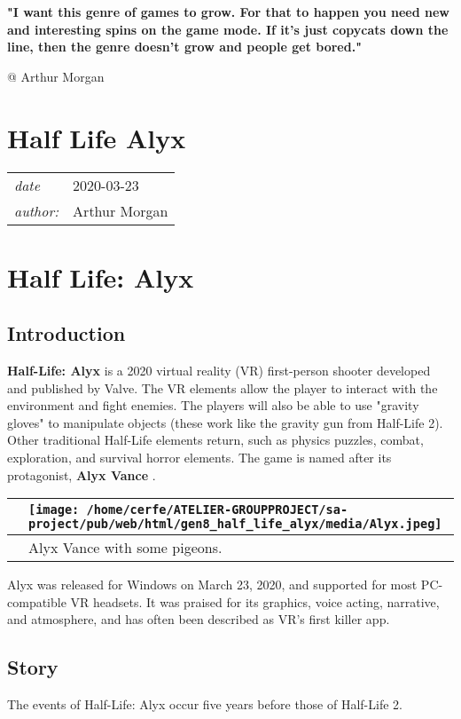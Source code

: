 \documentclass[a4paper,10pt]{book}
\newcommand{\pageHeader}[4]{
    \section{#1}
    \vspace{-0.3cm}
    \begin{table}[h!]
     \begin{tabular}{ll}
        \hline
        \textit{date} & #2 \\
        \textit{author: } & #3\\
        \hline
     \end{tabular}
    \end{table}
    \vspace{-0.3cm}
}
\begin{document}
 
 \textbf{
          "I want this genre of games to grow. For that to happen you need new and interesting spins on the game mode. If it's just copycats down the line, then the genre doesn't grow and people get bored."
         } 
 
 
 
          @ Arthur Morgan
       
 
 
 \newpage\pageHeader{Half Life Alyx}{2020-03-23}{Arthur Morgan}{VR's first killer app, Half Life: Alyx}
 \section{Half Life: Alyx }
 \subsection{Introduction }
 
 \textbf{Half-Life: Alyx }  is a 2020 virtual reality (VR) first-person shooter developed and published by Valve.
         The VR elements allow the player to interact with the environment and fight enemies.
         The players will also be able to use "gravity gloves" to manipulate objects (these work like the gravity gun from Half-Life 2).
         Other traditional Half-Life elements return, such as physics puzzles, combat, exploration, and survival horror elements. 
         The game is named after its protagonist,  \textbf{Alyx Vance } .
        
 \begin{longtable}{p{1mm}|l|}\hline
 
 & \texttt{[image: /home/cerfe/ATELIER-GROUPPROJECT/sa-project/pub/web/html/gen8\_half\_life\_alyx/media/Alyx.jpeg]}
 \\\hline
 
 & Alyx Vance with some pigeons. 
 \\\hline
 \end{longtable}
 
         Alyx was released for Windows on March 23, 2020, and supported for most PC-compatible VR headsets.
         It was praised for its graphics, voice acting, narrative, and atmosphere, and has often been described as VR's first killer app.
        
 
 \subsection{Story }
 
         The events of Half-Life: Alyx occur five years before those of Half-Life 2. 
 
\end{document}
